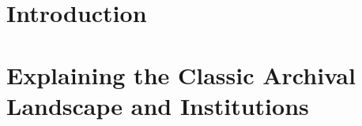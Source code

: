 \documentclass[twoside,11pt]{Latex/Classes/PhDthesisPSnPDF}
\begin{document}





% 







\mainmatter

\renewcommand{\chaptername}{} %





\chapter{Introduction}

\chapter{Explaining the Classic Archival Landscape and Institutions}
\end{document}
